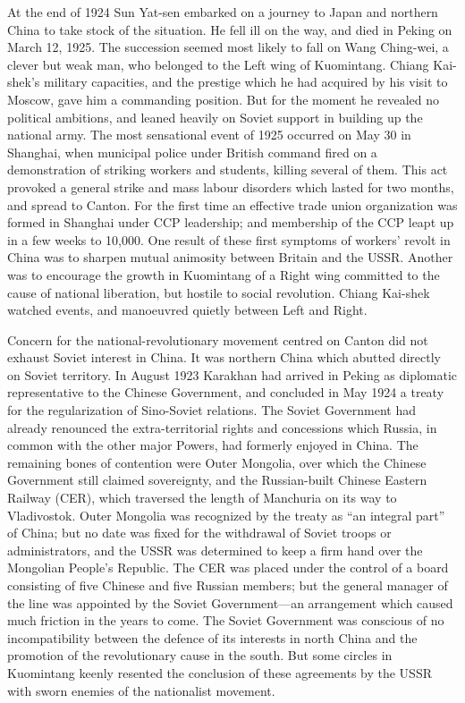At the end of 1924 Sun Yat-sen embarked on a journey to Japan and northern China to take stock of the situation. He fell ill on the way, and died in Peking on March 12, 1925. The succession seemed most likely to fall on Wang Ching-wei, a clever but weak man, who belonged to the Left wing of Kuomintang. Chiang Kai-shek's military capacities, and the prestige which he had acquired by his visit to Moscow, gave him a commanding position. But for the moment he revealed no political ambitions, and leaned heavily on Soviet support in building up the national army. The most sensational event of 1925 occurred on May 30 in Shanghai, when municipal police under British command fired on a demonstration of striking workers and students, killing several of them. This act provoked a general strike and mass labour disorders which lasted for two months, and spread to Canton. For the first time an effective trade union organization was formed in Shanghai under CCP leadership; and membership of the CCP leapt up in a few weeks to 10,000. One result of these first symptoms of workers' revolt in China was to sharpen mutual animosity between Britain and the USSR. Another was to encourage the growth in Kuomintang of a Right wing committed to the cause of national liberation, but hostile to social revolution. Chiang Kai-shek watched events, and manoeuvred quietly between Left and Right. 

Concern for the national-revolutionary movement centred on Canton did not exhaust Soviet interest in China. It was northern China which abutted directly on Soviet territory. In August 1923 Karakhan had arrived in Peking as diplomatic representative to the Chinese Government, and concluded in May 1924 a treaty for the regularization of Sino-Soviet relations. The Soviet Government had already renounced the extra-territorial rights and concessions which Russia, in common with the other major Powers, had formerly enjoyed in China. The remaining bones of contention were Outer Mongolia, over which the Chinese Government still claimed sovereignty, and the Russian-built Chinese Eastern Railway (CER), which traversed the length of Manchuria on its way to Vladivostok. Outer Mongolia was recognized by the treaty as ``an integral part'' of China; but no date was fixed for the withdrawal of Soviet troops or administrators, and the USSR was determined to keep a firm hand over the Mongolian People's Republic. The CER was placed under the control of a board consisting of five Chinese and five Russian members; but the general manager of the line was appointed by the Soviet Government---an arrangement which caused much friction in the years to come. The Soviet Government was conscious of no incompatibility between the defence of its interests in north China and the promotion of the revolutionary cause in the south. But some circles in Kuomintang keenly resented the conclusion of these agreements by the USSR with sworn enemies of the nationalist movement. 

